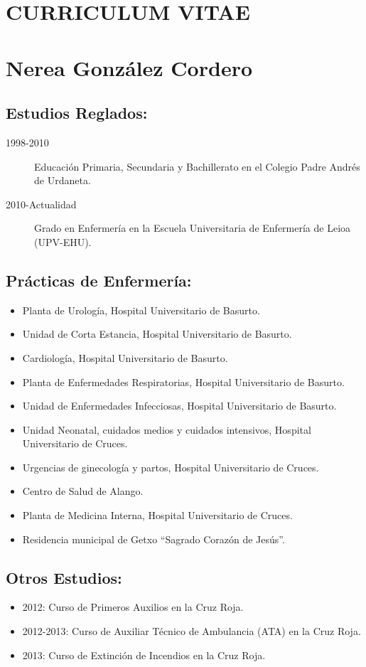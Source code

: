 \documentclass[10pt,a4paper,notitlepage]{article}
\author{Nerea Gonzalez Cordero}
\begin{document}
\section*{CURRICULUM VITAE}
\section*{Nerea González Cordero}
\subsection*{Estudios Reglados:}
\begin{description}
  \item[1998-2010] Educación Primaria, Secundaria y Bachillerato en el Colegio Padre Andrés de Urdaneta.
  \item[2010-Actualidad] Grado en Enfermería en la Escuela Universitaria de Enfermería de Leioa (UPV-EHU).
\end{description}

\subsection*{Prácticas de Enfermería:}
\begin{itemize}
  \item Planta de Urología, Hospital Universitario de Basurto.
  \item Unidad de Corta Estancia, Hospital Universitario de Basurto.
  \item Cardiología, Hospital Universitario de Basurto.
  \item Planta de Enfermedades Respiratorias, Hospital Universitario de Basurto.
  \item Unidad de Enfermedades Infecciosas, Hospital Universitario de Basurto.
  \item Unidad Neonatal, cuidados medios y cuidados intensivos, Hospital Universitario de Cruces.
  \item Urgencias de ginecología y partos, Hospital Universitario de Cruces.
  \item Centro de Salud de Alango.
  \item Planta de Medicina Interna, Hospital Universitario de Cruces.
  \item Residencia municipal de Getxo ``Sagrado Corazón de Jesús''.
\end{itemize}

\subsection*{Otros Estudios:}
\begin{itemize}
  \item 2012: Curso de Primeros Auxilios en la Cruz Roja.
  \item 2012-2013: Curso de Auxiliar Técnico de Ambulancia (ATA) en la Cruz Roja.
  \item 2013: Curso de Extinción de Incendios en la Cruz Roja.
\end{itemize}
\end{document}
